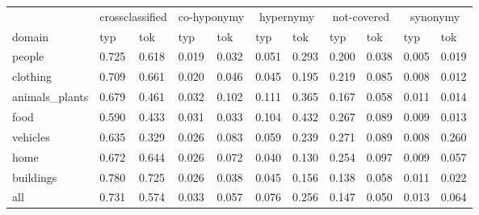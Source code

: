 \begin{table*}


\begin{tabular}{l|ll|ll|ll|ll|ll}
\toprule
      & \multicolumn{2}{c}{crossclassified} & \multicolumn{2}{c}{co-hyponymy} & \multicolumn{2}{c}{hypernymy} & \multicolumn{2}{c}{not-covered} & \multicolumn{2}{c}{synonymy} \\
         domain & typ & tok & typ & tok & typ & tok & typ &  tok & typ & tok \\
\midrule
 people &  0.725 &  0.618 &  0.019 &  0.032 &  0.051 &  0.293 &  0.200 &  0.038 &  0.005 &  0.019 \\
 clothing &  0.709 &  0.661 &  0.020 &  0.046 &  0.045 &  0.195 &  0.219 &  0.085 &  0.008 &  0.012 \\
 animals\_plants &  0.679 &  0.461 &  0.032 &  0.102 &  0.111 &  0.365 &  0.167 &  0.058 &  0.011 &  0.014 \\
 food &  0.590 &  0.433 &  0.031 &  0.033 &  0.104 &  0.432 &  0.267 &  0.089 &  0.009 &  0.013 \\
 vehicles &  0.635 &  0.329 &  0.026 &  0.083 &  0.059 &  0.239 &  0.271 &  0.089 &  0.008 &  0.260 \\
 home &  0.672 &  0.644 &  0.026 &  0.072 &  0.040 &  0.130 &  0.254 &  0.097 &  0.009 &  0.057 \\
 buildings &  0.780 &  0.725 &  0.026 &  0.038 &  0.045 &  0.156 &  0.138 &  0.058 &  0.011 &  0.022 \\
 \hline
 all &  0.731 &  0.574 &  0.033 &  0.057 &  0.076 &  0.256 &  0.147 &  0.050 &  0.013 &  0.064 \\
\bottomrule
\end{tabular}



\end{table*}
